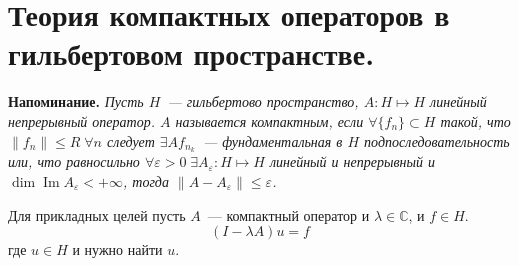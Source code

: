 \documentclass[12pt]{article}
\renewcommand{\Im}{\operatorname{Im}}
\begin{document}
\newtheorem{Theor}{Теорема}
\newtheorem{Utv}{Утверждение}
\newtheorem{Opr}{Определение}
\newtheorem{Upr}{Упражнение}
\newtheorem{Nabl}{Наблюдение}
\newtheorem{Zam}{Замечание}
\section*{Теория компактных операторов в гильбертовом пространстве.}
\textbf{Напоминание. }
{\sl
    Пусть  $H$~--- гильбертово пространство, $A : H \mapsto H$ линейный
    непрерывный оператор.
    $A$ называется компактным, если $\forall\{f_n\} \subset H$ такой, что
    $\|f_n\|\le R\;\forall n$ следует $\exists A f_{n_k}$~--- фундаментальная
    в $H$ подпоследовательность или, что равносильно $\forall \varepsilon > 0
    \;\exists A_\varepsilon : H \mapsto H$ линейный и непрерывный и $\dim \Im
    A_\varepsilon < + \infty$, тогда $\|A - A_\varepsilon\| \le \varepsilon$.
}

Для прикладных целей пусть $A$~--- компактный оператор и $\lambda \in
\mathbb C$, и $f \in H$.
$$
(I - \lambda A)u = f
$$
где $u \in H$ и нужно найти $u$.
\end{document}
